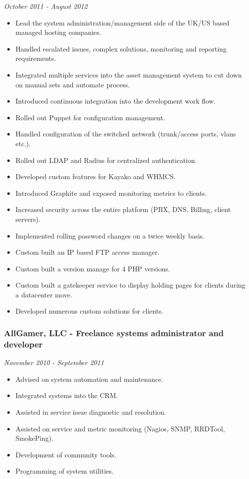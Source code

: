 \emph{October 2011 - August 2012}

\begin{itemize}
\itemsep1pt\parskip0pt
\item
  Lead the system administration/management side of the UK/US based
  managed hosting companies.
\item
  Handled escalated issues, complex solutions, monitoring and reporting
  requirements.
\item
  Integrated multiple services into the asset management system to cut
  down on manual sets and automate process.
\item
  Introduced continuous integration into the development work flow.
\item
  Rolled out Puppet for configuration management.
\item
  Handled configuration of the switched network (trunk/access ports,
  vlans etc.).
\item
  Rolled out LDAP and Radius for centralized authentication.
\item
  Developed custom features for Kayako and WHMCS.
\item
  Introduced Graphite and exposed monitoring metrics to clients.
\item
  Increased security across the entire platform (PBX, DNS, Billing,
  client servers).
\item
  Implemented rolling password changes on a twice weekly basis.
\item
  Custom built an IP based FTP access manager.
\item
  Custom built a version manage for 4 PHP versions.
\item
  Custom built a gatekeeper service to display holding pages for clients
  during a datacenter move.
\item
  Developed numerous custom solutions for clients.
\end{itemize}

\subsubsection{AllGamer, LLC - Freelance systems administrator and
developer}\label{allgamer-llc---freelance-systems-administrator-and-developer}

\emph{November 2010 - September 2011}

\begin{itemize}
\itemsep1pt\parskip0pt
\item
  Advised on system automation and maintenance.
\item
  Integrated systems into the CRM.
\item
  Assisted in service issue diagnostic and resolution.
\item
  Assisted on service and metric monitoring (Nagios, SNMP, RRDTool,
  SmokePing).
\item
  Development of community tools.
\item
  Programming of system utilities.
\end{itemize}

